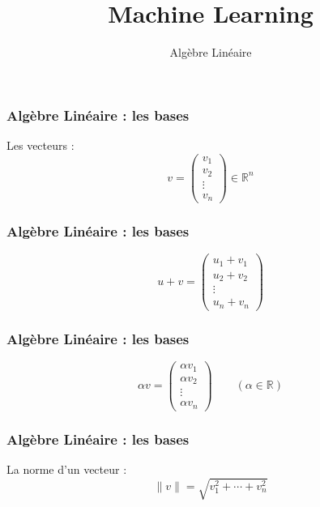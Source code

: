 \documentclass{formation}
\title{Machine Learning}
\subtitle{Algèbre Linéaire}
\begin{document}
\maketitle


\begin{frame}
  \frametitle{Algèbre Linéaire : les bases}
  Les vecteurs :
  \begin{displaymath}
    v = 
    \begin{pmatrix}
      v_1\\
      v_2\\
      \vdots\\
      v_n
    \end{pmatrix}
    \in \mathbb{R}^n
  \end{displaymath}
\end{frame}

\begin{frame}
  \frametitle{Algèbre Linéaire : les bases}
    \begin{displaymath}
        u + v = 
      \begin{pmatrix}
        u_1 + v_1\\
        u_2 + v_2\\
        \vdots\\
        u_n + v_n
      \end{pmatrix}
    \end{displaymath}
\end{frame}

\begin{frame}
  \frametitle{Algèbre Linéaire : les bases}
    \begin{displaymath}
      \alpha v =
      \begin{pmatrix}
        \alpha v_1\\
        \alpha  v_2\\
        \vdots\\
        \alpha v_n
      \end{pmatrix}
       \qquad (\alpha\in\mathbb{R})
    \end{displaymath}
\end{frame}

\begin{frame}
  \frametitle{Algèbre Linéaire : les bases}
  La norme d'un vecteur :
    \begin{displaymath}
      \parallel v\parallel = \sqrt{v_1^2 + \cdots + v_n^2}
    \end{displaymath}
\end{frame}
\end{document}
